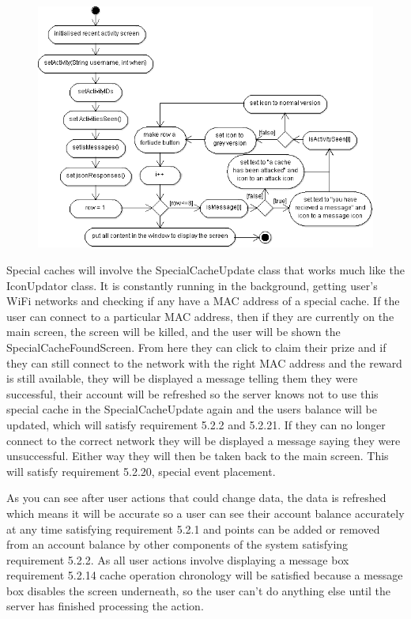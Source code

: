 \begin{figure}
    \centering
    \includegraphics[width=\textwidth]{images/activity/recentActivity}
\end{figure}

Special caches will involve the SpecialCacheUpdate class that works much like the IconUpdator class. It is constantly running in the background, getting user's WiFi networks and checking if any have a MAC address of a special cache. If the user can connect to a particular MAC address, then if they are currently on the main screen, the screen will be killed, and the user will be shown the SpecialCacheFoundScreen. From here they can click to claim their prize and if they can still connect to the network with the right MAC address and the reward is still available, they will be displayed a message telling them they were successful, their account will be refreshed so the server knows not to use this special cache in the SpecialCacheUpdate again and the users balance will be updated, which will satisfy requirement 5.2.2 and 5.2.21. If they can no longer connect to the correct network they will be displayed a message saying they were unsuccessful. Either way they will then be taken back to the main screen. This will satisfy requirement 5.2.20, special event placement.

As you can see after user actions that could change data, the data is refreshed which means it will be accurate so a user can see their account balance accurately at any time satisfying requirement 5.2.1 and points can be added or removed from an account balance by other components of the system satisfying requirement 5.2.2. As all user actions involve displaying a message box requirement 5.2.14 cache operation chronology will be satisfied because a message box disables the screen underneath, so the user can't do anything else until the server has finished processing the action.

